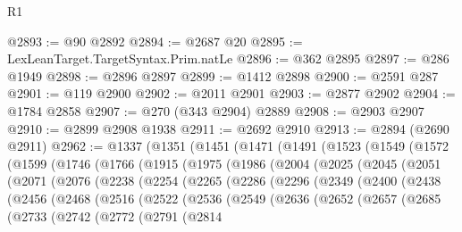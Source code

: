 \begin{lexlean}{R1}
\begin{coremodule}
@2893 := @90 @2892
@2894 := @2687 @20
@2895 := LexLeanTarget.TargetSyntax.Prim.natLe
@2896 := @362 @2895
@2897 := @286 @1949
@2898 := @2896 @2897
@2899 := @1412 @2898
@2900 := @2591 @287
@2901 := @119 @2900
@2902 := @2011 @2901
@2903 := @2877 @2902
@2904 := @1784 @2858
@2907 := @270 (@343 @2904) @2889
@2908 := @2903 @2907
@2910 := @2899 @2908 @1938
@2911 := @2692 @2910
@2913 := @2894 (@2690 @2911)
@2962 := @1337
    (@1351
      (@1451
        (@1471
          (@1491
            (@1523
              (@1549
                (@1572
                  (@1599
                    (@1746
                      (@1766
                        (@1915
                          (@1975
                            (@1986
                              (@2004
                                (@2025
                                  (@2045
                                    (@2051
                                      (@2071
                                        (@2076
                                          (@2238
                                            (@2254
                                              (@2265
                                                (@2286
                                                  (@2296
                                                    (@2349
                                                      (@2400
                                                        (@2438
                                                          (@2456
                                                            (@2468
                                                              (@2516
                                                                (@2522
                                                                  (@2536
                                                                    (@2549
                                                                      (@2636
                                                                        (@2652
                                                                          (@2657
                                                                            (@2685
                                                                              (@2733
                                                                                (@2742
                                                                                  (@2772
                                                                                    (@2791
                                                                                      (@2814

\end{coremodule}
\end{lexlean}
